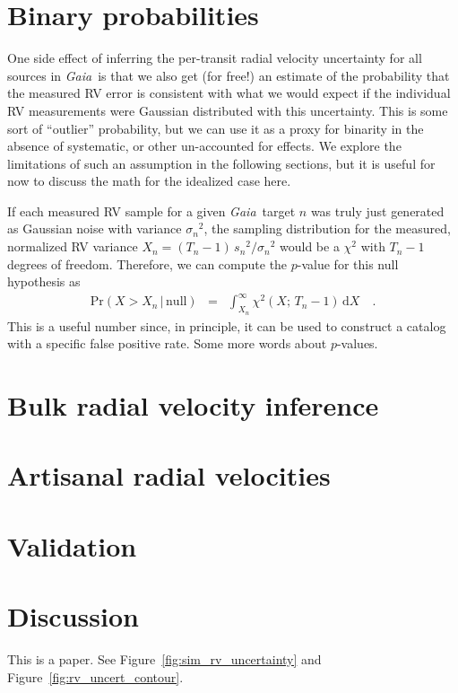 \documentclass[modern, letterpaper]{aastex63}
\newcommand{\project}[1]{\textsl{#1}}
\newcommand{\Gaia}{\project{Gaia}}
\newcommand{\dd}{\ensuremath{\,\mathrm{d}}}
\begin{document}
\section{Binary probabilities}

One side effect of inferring the per-transit radial velocity uncertainty for all sources in \Gaia\ is that we also get (for free!) an estimate of the probability that the measured RV error is consistent with what we would expect if the individual RV measurements were Gaussian distributed with this uncertainty.
This is some sort of ``outlier'' probability, but we can use it as a proxy for binarity in the absence of systematic, or other un-accounted for effects.
We explore the limitations of such an assumption in the following sections, but it is useful for now to discuss the math for the idealized case here.

If each measured RV sample for a given \Gaia\ target $n$ was truly just generated as Gaussian noise with variance ${\sigma_n}^2$, the sampling distribution for the measured, normalized RV variance $X_n = (T_n - 1)\,{s_n}^2 / {\sigma_n}^2$ would be a $\chi^2$ with $T_n - 1$ degrees of freedom.
Therefore, we can compute the $p$-value for this null hypothesis as
\begin{eqnarray}
\mathrm{Pr}(X > X_n\,|\,\mathrm{null}) &=& \int_{X_n}^\infty \chi^2 (X;\,T_n-1) \dd X \quad.
\end{eqnarray}
This is a useful number since, in principle, it can be used to construct a catalog with a specific false positive rate.
Some more words about $p$-values.

\section{Bulk radial velocity inference}

\section{Artisanal radial velocities}

\section{Validation}

\section{Discussion}

This is a paper.
See Figure~\ref{fig:sim_rv_uncertainty} and Figure~\ref{fig:rv_uncert_contour}.
\end{document}
